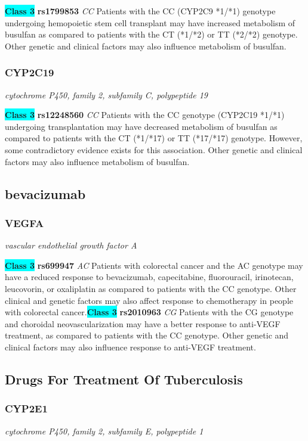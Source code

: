 \documentclass{report}
\begin{document}
\textbf{\colorbox{cyan} {Class 3}} \textbf{ rs1799853 } \textit{ CC }
Patients with the CC (CYP2C9 *1/*1) genotype undergoing hemopoietic stem cell transplant may have increased metabolism of busulfan as compared to patients with the CT (*1/*2) or TT (*2/*2) genotype. Other genetic and clinical factors may also influence metabolism of busulfan.\newline\subsubsection{ CYP2C19 }
\textit{ cytochrome P450, family 2, subfamily C, polypeptide 19 }

\textbf{\colorbox{cyan} {Class 3}} \textbf{ rs12248560 } \textit{ CC }
Patients with the CC genotype (CYP2C19 *1/*1) undergoing transplantation may have decreased metabolism of busulfan as compared to patients with the CT (*1/*17) or TT (*17/*17) genotype. However, some contradictory evidence exists for this association. Other genetic and clinical factors may also influence metabolism of busulfan.\newline\subsection{ bevacizumab }\subsubsection{ VEGFA }
\textit{ vascular endothelial growth factor A }

\textbf{\colorbox{cyan} {Class 3}} \textbf{ rs699947 } \textit{ AC }
Patients with colorectal cancer and the AC genotype may have a reduced response to bevacizumab, capecitabine, fluorouracil, irinotecan, leucovorin, or oxaliplatin as compared to patients with the CC genotype. Other clinical and genetic factors may also affect response to chemotherapy in people with colorectal cancer.\newline\textbf{\colorbox{cyan} {Class 3}} \textbf{ rs2010963 } \textit{ CG }
Patients with the CG genotype and choroidal neovascularization may have a better response to anti-VEGF treatment, as compared to patients with the CC genotype. Other genetic and clinical factors may also influence response to anti-VEGF treatment. \newline\subsection{ Drugs For Treatment Of Tuberculosis }\subsubsection{ CYP2E1 }
\textit{ cytochrome P450, family 2, subfamily E, polypeptide 1 }
\end{document}
